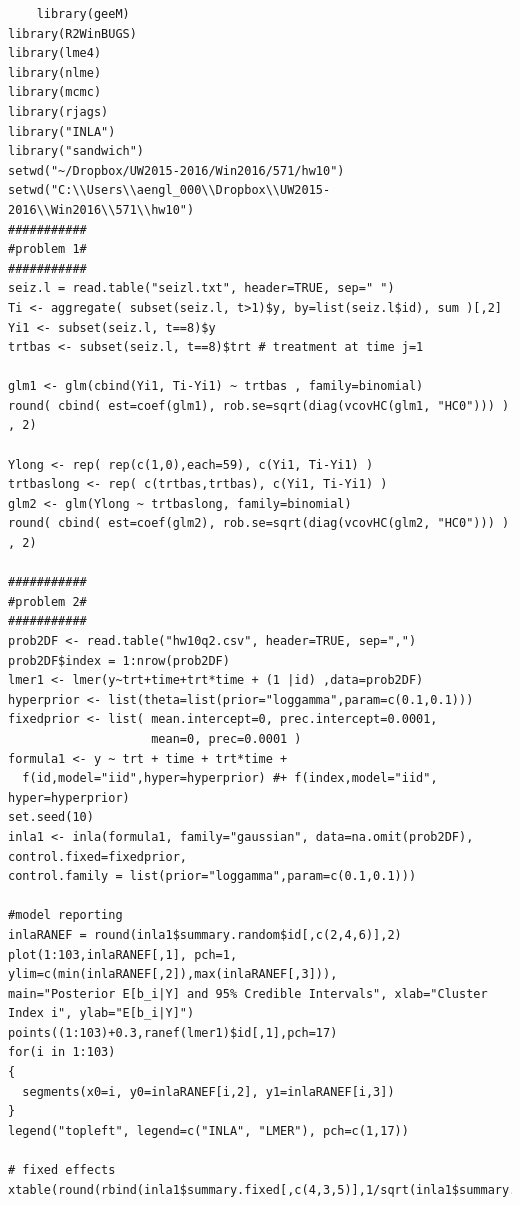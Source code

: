 \documentclass[11pt]{article}
\begin{document}
\begin{verbatim}
	library(geeM)
library(R2WinBUGS)
library(lme4)
library(nlme)
library(mcmc)
library(rjags)
library("INLA")
library("sandwich")
setwd("~/Dropbox/UW2015-2016/Win2016/571/hw10")
setwd("C:\\Users\\aengl_000\\Dropbox\\UW2015-2016\\Win2016\\571\\hw10")
###########
#problem 1#
###########
seiz.l = read.table("seizl.txt", header=TRUE, sep=" ")
Ti <- aggregate( subset(seiz.l, t>1)$y, by=list(seiz.l$id), sum )[,2]
Yi1 <- subset(seiz.l, t==8)$y
trtbas <- subset(seiz.l, t==8)$trt # treatment at time j=1

glm1 <- glm(cbind(Yi1, Ti-Yi1) ~ trtbas , family=binomial)
round( cbind( est=coef(glm1), rob.se=sqrt(diag(vcovHC(glm1, "HC0"))) ) , 2)

Ylong <- rep( rep(c(1,0),each=59), c(Yi1, Ti-Yi1) )
trtbaslong <- rep( c(trtbas,trtbas), c(Yi1, Ti-Yi1) )
glm2 <- glm(Ylong ~ trtbaslong, family=binomial)
round( cbind( est=coef(glm2), rob.se=sqrt(diag(vcovHC(glm2, "HC0"))) ) , 2)

###########
#problem 2#
###########
prob2DF <- read.table("hw10q2.csv", header=TRUE, sep=",")
prob2DF$index = 1:nrow(prob2DF)
lmer1 <- lmer(y~trt+time+trt*time + (1 |id) ,data=prob2DF)
hyperprior <- list(theta=list(prior="loggamma",param=c(0.1,0.1)))
fixedprior <- list( mean.intercept=0, prec.intercept=0.0001,
                    mean=0, prec=0.0001 )
formula1 <- y ~ trt + time + trt*time +
  f(id,model="iid",hyper=hyperprior) #+ f(index,model="iid", hyper=hyperprior)
set.seed(10)
inla1 <- inla(formula1, family="gaussian", data=na.omit(prob2DF), control.fixed=fixedprior, 
control.family = list(prior="loggamma",param=c(0.1,0.1)))

#model reporting
inlaRANEF = round(inla1$summary.random$id[,c(2,4,6)],2)
plot(1:103,inlaRANEF[,1], pch=1, ylim=c(min(inlaRANEF[,2]),max(inlaRANEF[,3])),
main="Posterior E[b_i|Y] and 95% Credible Intervals", xlab="Cluster Index i", ylab="E[b_i|Y]")
points((1:103)+0.3,ranef(lmer1)$id[,1],pch=17)
for(i in 1:103)
{
  segments(x0=i, y0=inlaRANEF[i,2], y1=inlaRANEF[i,3])
}
legend("topleft", legend=c("INLA", "LMER"), pch=c(1,17))

# fixed effects
xtable(round(rbind(inla1$summary.fixed[,c(4,3,5)],1/sqrt(inla1$summary.hyperpar[,c(4,3,5)])),2))


\end{verbatim}
\end{document}
